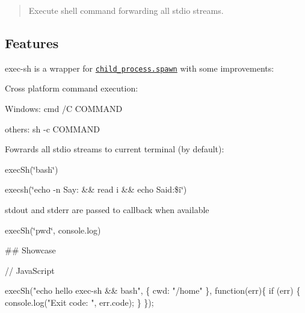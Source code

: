 \href{https://nodei.co/npm/exec-sh/}{\tt }

\href{https://travis-ci.org/tsertkov/exec-sh}{\tt } \href{https://coveralls.io/r/tsertkov/exec-sh?branch=master}{\tt } \href{https://david-dm.org/tsertkov/exec-sh}{\tt }

\begin{quote}
Execute shell command forwarding all stdio streams. \end{quote}


\subsection*{Features}

exec-\/sh is a wrapper for \href{http://nodejs.org/api/child_process.html#child_process_child_process_spawn_command_args_options}{\tt {\ttfamily child\+\_\+process.\+spawn}} with some improvements\+:


\begin{DoxyItemize}
\item Cross platform command execution\+:
\begin{DoxyItemize}
\item Windows\+: {\ttfamily cmd /C C\+O\+M\+M\+A\+ND}
\item others\+: {\ttfamily sh -\/c C\+O\+M\+M\+A\+ND}
\end{DoxyItemize}
\item Fowrards all stdio streams to current terminal (by default)\+:
\begin{DoxyItemize}
\item {\ttfamily exec\+Sh(\char`\"{}bash\char`\"{})}
\item {\ttfamily execsh(\char`\"{}echo -\/n Say\+: \&\& read i \&\& echo Said\+:\$i\char`\"{})}
\end{DoxyItemize}
\item stdout and stderr are passed to callback when available
\begin{DoxyItemize}
\item {\ttfamily exec\+Sh(\char`\"{}pwd\char`\"{}, console.\+log)}
\end{DoxyItemize}
\end{DoxyItemize}

\#\# Showcase 
\begin{DoxyCode}
// JavaScript

execSh("echo hello exec-sh && bash", \{ cwd: "/home" \}, function(err)\{
  if (err) \{
    console.log("Exit code: ", err.code);
  \}
\});
\end{DoxyCode}



